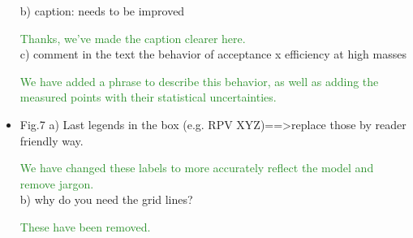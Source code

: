 \documentclass[paper=a4, fontsize=11pt]{scrartcl}
\begin{document}
\begin{itemize}
b) caption: needs to be improved

\textcolor{ForestGreen}{Thanks, we've made the caption clearer here.}\\


c) comment in the text the behavior of acceptance x efficiency at high masses 

\textcolor{ForestGreen}{We have added a phrase to describe this behavior, as well
as adding the measured points with their statistical uncertainties.}\\


\item Fig.7 
a) Last legends in the box (e.g. RPV XYZ)==\textgreater replace those by reader friendly way. 

\textcolor{ForestGreen}{We have changed these labels to more accurately reflect the model and remove jargon.}\\

b) why do you need the grid lines? 

\textcolor{ForestGreen}{These have been removed.}\\


\end{itemize}
\end{document}
